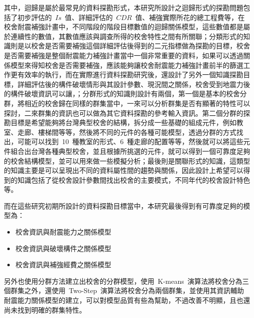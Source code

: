 其中，迴歸是屬於最常見的資料探勘形式，本研究所設計之迴歸形式的探勘問題包括了初步評估的~$Is$~值、詳細評估的~$CDR$~值、補強實際所花的總工程費等，在校舍耐震補強計畫中，不同階段的階段目標數值的迴歸關係模型，這些數值都是屬於連續性的數值，其數值應該與調查所得的校舍特性之間有所關聯；分類形式的知識則是以校舍是否需要補強這個詳細評估後得到的二元指標做為探勘的目標，校舍是否需要補強是整個耐震能力補強計畫當中一個非常重要的資料，如果可以透過關係模型來得知校舍是否需要補強，應該能夠讓校舍耐震能力補強計畫前半的篩選工作更有效率的執行，而在實際進行資料探勘研究後，還設計了另外一個知識探勘目標，詳細評估後的構件破壞情形與其設計參數、現況間之關係，校舍受到地震力後的構件破壞資訊可以讓，；分群形式的知識則設計有兩個，第一個是基本的校舍分群，將相近的校舍歸在同樣的群集當中，一來可以分析群集是否有顯著的特性可以探討，二來群集的資訊也可以做為其它資料探勘的參考輸入資訊。第二個分群的探勘目標是希望能夠將台灣典型校舍的結構，拆分成一些基礎的組成元件，例如教室、走廊、樓梯間等等，然後將不同的元件的各種可能模型，透過分群的方式找出，可能可以找到~10~種教室的形式、6~種走廊的配置等等，然後就可以將這些元件組合出台灣各種典型校舍，並且根據所挑選的元件，就可以得到一個可靠度足夠的校舍結構模型，並可以用來做一些模擬分析；最後則是關聯形式的知識，這類型的知識主要是可以呈現出不同的資料屬性間的趨勢與關係，因此設計上希望可以得到的知識包括了從校舍設計參數間找出校舍的主要模式，不同年代的校舍設計特色等。

而在這些研究初期所設計的資料探勘目標當中，本研究最後得到有可靠度足夠的模型為：

\begin{itemize}
  \item 校舍資訊與耐震能力之關係模型
  \item 校舍資訊與破壞構件之關係模型
  \item 校舍資訊與補強經費之關係模型
\end{itemize}

另外也使用分群方法建立出校舍的分群模型，使用~K-means~演算法將校舍分為三個群集之外，還使用~Two-Step~演算法將校舍分為兩個群集，並使用其資訊輔助耐震能力關係模型的建立，可以對模型品質有些為幫助，不過改善不明顯，且也還尚未找到明確的群集特性。


